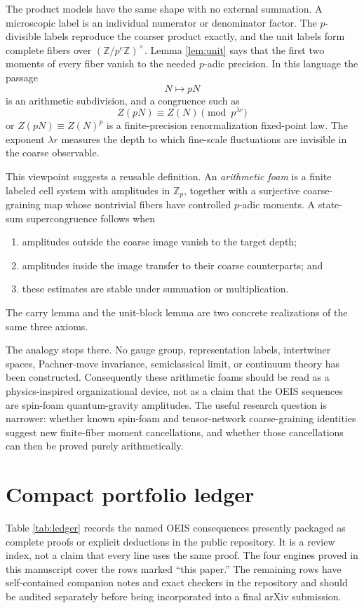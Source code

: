 \documentclass[11pt]{article}
\theoremstyle{definition}
\newcommand{\Z}{\mathbb Z}
\begin{document}
The product models have the same shape with no external summation.  A
microscopic label is an individual numerator or denominator factor.  The
$p$-divisible labels reproduce the coarser product exactly, and the unit
labels form complete fibers over $(\Z/p^e\Z)^\times$.  Lemma
\ref{lem:unit} says that the first two moments of every fiber vanish to the
needed $p$-adic precision.  In this language the passage
\[
 N\longmapsto pN
\]
is an arithmetic subdivision, and a congruence such as
\[
 Z(pN)\equiv Z(N)\pmod {p^{\lambda r}}
\]
or $Z(pN)\equiv Z(N)^p$ is a finite-precision renormalization fixed-point
law.  The exponent $\lambda r$ measures the depth to which fine-scale
fluctuations are invisible in the coarse observable.

This viewpoint suggests a reusable definition.  An \emph{arithmetic foam}
is a finite labeled cell system with amplitudes in $\Z_p$, together with a
surjective coarse-graining map whose nontrivial fibers have controlled
$p$-adic moments.  A state-sum supercongruence follows when
\begin{enumerate}
\item amplitudes outside the coarse image vanish to the target depth;
\item amplitudes inside the image transfer to their coarse counterparts;
      and
\item these estimates are stable under summation or multiplication.
\end{enumerate}
The carry lemma and the unit-block lemma are two concrete realizations of
the same three axioms.

The analogy stops there.  No gauge group, representation labels,
intertwiner spaces, Pachner-move invariance, semiclassical limit, or
continuum theory has been constructed.  Consequently these arithmetic
foams should be read as a physics-inspired organizational device, not as a
claim that the OEIS sequences are spin-foam quantum-gravity amplitudes.
The useful research question is narrower: whether known spin-foam and
tensor-network coarse-graining identities suggest new finite-fiber moment
cancellations, and whether those cancellations can then be proved purely
arithmetically.

\section{Compact portfolio ledger}

Table \ref{tab:ledger} records the named OEIS consequences presently
packaged as complete proofs or explicit deductions in the public
repository.  It is a review index, not a claim that every line uses the
same proof.  The four engines proved in this manuscript cover the rows
marked ``this paper.''  The remaining rows have self-contained companion
notes and exact checkers in the repository and should be audited separately
before being incorporated into a final arXiv submission.
\end{document}
